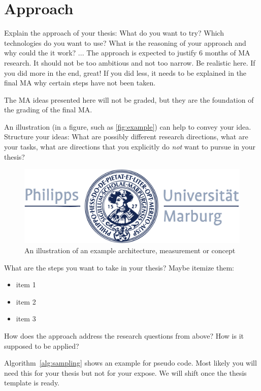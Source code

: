 \section{Approach}
\label{sec:approach}

Explain the approach of your thesis: What do you want to try? Which technologies do you want to use? What is the reasoning of your approach and why could the it work? ... The approach is expected to justify 6 months of MA research. It should not be too ambitious and not too narrow. Be realistic here. If you did more in the end, great! If you did less, it needs to be explained in the final MA why certain steps have not been taken.

The MA ideas presented here will not be graded, but they are the foundation of the grading of the final MA.

An illustration (in a figure, such as \autoref{fig:example}) can help to convey your idea. Structure your ideas: What are possibly different research directions, what are your tasks, what are directions that you explicitly do \emph{not} want to pursue in your thesis?

\begin{figure}[h]
	\centering
	\includegraphics[width=0.6\linewidth]{gfx/logo_blue.pdf}
	\caption{An illustration of an example architecture, measurement or concept}
	\label{fig:example}
\end{figure}

What are the steps you want to take in your thesis? Maybe itemize them:

\begin{itemize}
	\item item 1
	\item item 2
	\item item 3
\end{itemize}

How does the approach address the research questions from above? How is it supposed to be applied?

Algorithm~\ref{alg:sampling} shows an example for pseudo code. Most likely you will need this for your thesis but not for your expose. We will shift once the thesis template is ready.


